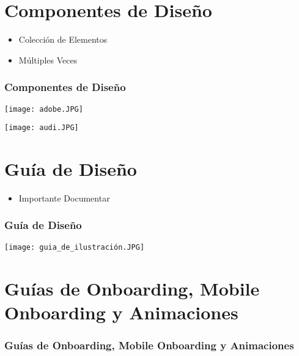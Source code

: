 \documentclass[11pt]{beamer}
\begin{document}
\section{Componentes de Diseño}
\begin{frame}
\begin{itemize}
\item Colección de Elementos
\item Múltiples Veces
\end{itemize}
\frametitle{Componentes de Diseño}
\begin{minipage}[c]{0.45\textwidth} 
\texttt{[image: adobe.JPG]} 
\newline \newline \newline \newline \newline \newline \newline \newline
\end{minipage}
\begin{minipage}[c]{0.3\textwidth} 
\texttt{[image: audi.JPG]} 
\newline \newline \newline
\end{minipage} 
\end{frame}

\section{Guía de Diseño}
\begin{frame}
\begin{itemize}
\item Importante Documentar
\end{itemize}
\frametitle{Guía de Diseño}
\texttt{[image: guia\_de\_ilustración.JPG]} 
\newline \newline \newline 
\end{frame}

\section{Guías de Onboarding, Mobile Onboarding y Animaciones}
\begin{frame}
\frametitle{Guías de Onboarding, Mobile Onboarding y Animaciones}
\newline
\end{frame}
\end{document}
